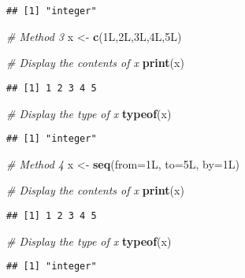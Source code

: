 \documentclass[
]{article}
\newenvironment{Shaded}{\begin{snugshade}}{\end{snugshade}}
\newcommand{\AttributeTok}[1]{\textcolor[rgb]{0.13,0.29,0.53}{#1}}
\newcommand{\CommentTok}[1]{\textcolor[rgb]{0.56,0.35,0.01}{\textit{#1}}}
\newcommand{\FunctionTok}[1]{\textcolor[rgb]{0.13,0.29,0.53}{\textbf{#1}}}
\newcommand{\NormalTok}[1]{#1}
\newcommand{\OtherTok}[1]{\textcolor[rgb]{0.56,0.35,0.01}{#1}}
\begin{document}
\begin{verbatim}
## [1] "integer"
\end{verbatim}

\begin{Shaded}
\begin{Highlighting}[]
\CommentTok{\# Method 3}
\NormalTok{x }\OtherTok{\textless{}{-}} \FunctionTok{c}\NormalTok{(1L,2L,3L,4L,5L)}

\CommentTok{\# Display the contents of x}
\FunctionTok{print}\NormalTok{(x)}
\end{Highlighting}
\end{Shaded}

\begin{verbatim}
## [1] 1 2 3 4 5
\end{verbatim}

\begin{Shaded}
\begin{Highlighting}[]
\CommentTok{\# Display the type of x}
\FunctionTok{typeof}\NormalTok{(x)}
\end{Highlighting}
\end{Shaded}

\begin{verbatim}
## [1] "integer"
\end{verbatim}

\begin{Shaded}
\begin{Highlighting}[]
\CommentTok{\# Method 4}
\NormalTok{x }\OtherTok{\textless{}{-}} \FunctionTok{seq}\NormalTok{(}\AttributeTok{from=}\NormalTok{1L, }\AttributeTok{to=}\NormalTok{5L, }\AttributeTok{by=}\NormalTok{1L)}

\CommentTok{\# Display the contents of x}
\FunctionTok{print}\NormalTok{(x)}
\end{Highlighting}
\end{Shaded}

\begin{verbatim}
## [1] 1 2 3 4 5
\end{verbatim}

\begin{Shaded}
\begin{Highlighting}[]
\CommentTok{\# Display the type of x}
\FunctionTok{typeof}\NormalTok{(x)}
\end{Highlighting}
\end{Shaded}

\begin{verbatim}
## [1] "integer"
\end{verbatim}
\end{document}

